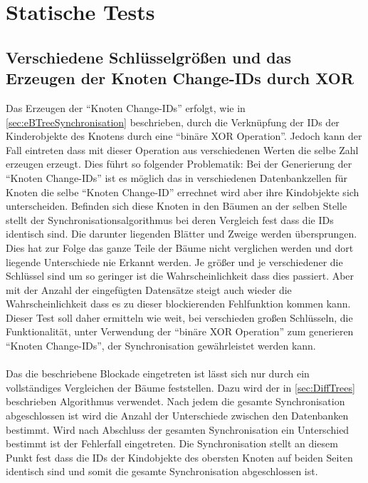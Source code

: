 \documentclass[a4paper,11pt,oneside,%
headsepline,												%
footsepline,												%
bibtotocnumbered									%
]{scrreprt}
\begin{document}
\newpage
\section{Statische Tests}
\subsection{Verschiedene Schlüsselgrößen und das Erzeugen der Knoten Change-IDs durch XOR}
\label{sec:XorError}
Das Erzeugen der \enquote{Knoten Change-IDs} erfolgt, wie in \autoref{sec:eBTreeSynchronisation} beschrieben, durch die Verknüpfung der IDs der Kinderobjekte des Knotens durch eine \enquote{binäre XOR Operation}. Jedoch kann der Fall eintreten dass mit dieser Operation aus verschiedenen Werten die selbe Zahl erzeugen erzeugt. Dies führt so folgender Problematik: Bei der Generierung der \enquote{Knoten Change-IDs} ist es möglich das in verschiedenen Datenbankzellen für Knoten die selbe \enquote{Knoten Change-ID}  errechnet wird aber ihre Kindobjekte sich unterscheiden. Befinden sich diese Knoten in den Bäumen an der selben Stelle stellt der Synchronisationsalgorithmus bei deren Vergleich fest dass die IDs identisch sind. Die darunter liegenden Blätter und Zweige werden übersprungen. Dies hat zur Folge das ganze Teile der Bäume nicht verglichen werden und dort liegende Unterschiede nie Erkannt werden. Je größer und je verschiedener die Schlüssel sind um so geringer ist die Wahrscheinlichkeit dass dies passiert. Aber mit der Anzahl der eingefügten Datensätze steigt auch wieder die Wahrscheinlichkeit dass es zu dieser blockierenden Fehlfunktion kommen kann. Dieser Test soll daher ermitteln wie weit, bei verschieden großen Schlüsseln, die Funktionalität, unter Verwendung der \enquote{binäre XOR Operation} zum generieren \enquote{Knoten Change-IDs}, der Synchronisation gewährleistet werden kann.\\\\
Das die beschriebene Blockade eingetreten ist lässt sich nur durch ein vollständiges Vergleichen der Bäume feststellen. Dazu wird der in \autoref{sec:DiffTrees} beschrieben Algorithmus verwendet. Nach jedem die gesamte Synchronisation abgeschlossen ist wird die Anzahl der Unterschiede zwischen den Datenbanken bestimmt. Wird nach Abschluss der gesamten Synchronisation ein Unterschied bestimmt ist der Fehlerfall eingetreten. Die Synchronisation stellt an diesem Punkt fest dass die IDs der Kindobjekte des obersten Knoten auf beiden Seiten identisch sind und somit die gesamte Synchronisation abgeschlossen ist. \\\\
\end{document}
